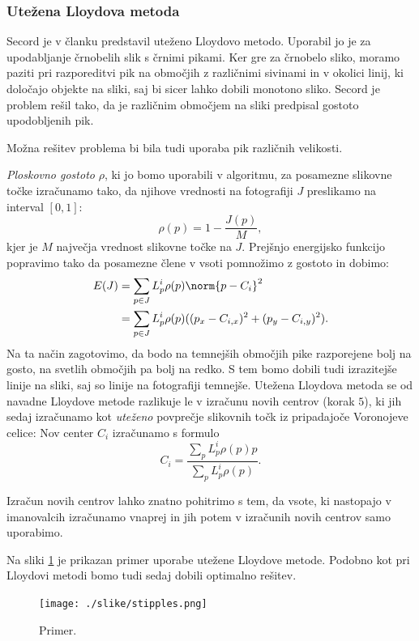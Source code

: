 \subsubsection{Utežena Lloydova metoda}
Secord je v članku \cite{Secord} predstavil uteženo Lloydovo metodo. Uporabil jo je za upodabljanje črnobelih slik s črnimi pikami. Ker gre za črnobelo sliko, moramo paziti pri razporeditvi pik na območjih z različnimi sivinami in v okolici linij, ki določajo objekte na sliki, saj bi sicer lahko dobili monotono sliko. Secord je problem rešil tako, da je različnim območjem na sliki predpisal gostoto upodobljenih pik.
%
\begin{opomba}
Možna rešitev problema bi bila tudi uporaba pik različnih velikosti.
\end{opomba}
%
\emph{Ploskovno gostoto} $\rho$, ki jo bomo uporabili v algoritmu, za posamezne slikovne točke izračunamo tako, da njihove vrednosti na fotografiji $J$ preslikamo na interval $[0, 1]$:
$$\rho(p) = 1 - \frac{J(p)}{M},$$
kjer je $M$ največja vrednost slikovne točke na $J$. Prejšnjo energijsko funkcijo popravimo tako da posamezne člene v vsoti pomnožimo z gostoto in dobimo:
%
\begin{align*}
E(J) & = \sum_{p \in J} L_p^i \rho(p) \norm{p - C_i}^2 \\
       & = \sum_{p \in J} L_p^i \rho(p) ((p_x - C_{i, x})^2 + (p_y - C_{i, y})^2).
\end{align*}
%
Na ta način zagotovimo, da bodo na temnejših območjih pike razporejene bolj na gosto, na svetlih območjih pa bolj na redko. S tem bomo dobili tudi izrazitejše linije na sliki, saj so linije na fotografiji temnejše. Utežena Lloydova metoda se od navadne Lloydove metode razlikuje le v izračunu novih centrov (korak $5$), ki jih sedaj izračunamo kot \emph{uteženo} povprečje slikovnih točk iz pripadajoče Voronojeve celice: Nov center $C_i$ izračunamo s formulo
%
$$C_i = \frac{\sum_p L_p^i \rho(p)p}{\sum_p L_p^i \rho(p)}.$$
%
\begin{opomba}
Izračun novih centrov lahko znatno pohitrimo s tem, da vsote, ki nastopajo v imanovalcih izračunamo vnaprej in jih potem v izračunih novih centrov samo uporabimo.
\end{opomba}
%
Na sliki \ref{fig:stipples} je prikazan primer uporabe utežene Lloydove metode. Podobno kot pri Lloydovi metodi bomo tudi sedaj dobili optimalno rešitev.
%
\begin{figure}[htb]
\centering
\texttt{[image: ./slike/stipples.png]}
\caption{Primer.}
\label{fig:stipples}
\end{figure}
%
